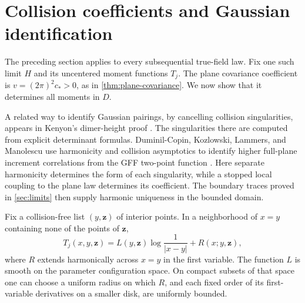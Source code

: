 \section{Collision coefficients and Gaussian identification}
\label{sec:gaussian}

The preceding section applies to every subsequential true-field law.
Fix one such limit $H$ and its uncentered moment functions $T_j$.
The plane covariance coefficient is
$v=(2\pi)^2c_*>0$, as in \cref{thm:plane-covariance}. We now show
that it determines all moments in $D$.

A related way to identify Gaussian pairings, by cancelling collision
singularities, appears in Kenyon's dimer-height proof
\cite[Lemma~3.1 and Proposition~3.2]{Kenyon2001}.  The singularities there
are computed from explicit determinant formulas.  Duminil-Copin,
Kozlowski, Lammers, and Manolescu use harmonicity and collision asymptotics
to identify higher full-plane increment correlations from the GFF
two-point function
\cite[Section~7.2]{DCKLM2026}.  Here separate harmonicity determines the
form of each singularity, while a stopped local coupling to the plane law
determines its coefficient.  The boundary traces proved in
\cref{sec:limits} then supply harmonic uniqueness in the bounded domain.

\begin{lemma}
\label{lem:log-singularity}
Fix a collision-free list $(y,\mathbf z)$ of interior points. In a
neighborhood of $x=y$ containing none of the points of $\mathbf z$,
\begin{equation}
 T_j(x,y,\mathbf z)
     =L(y,\mathbf z)\log\frac1{|x-y|}+R(x;y,\mathbf z),
 \label{eq:log-expansion}
\end{equation}
where $R$ extends harmonically across $x=y$ in the first variable.
The function $L$ is smooth on the parameter configuration space.
On compact subsets of that space one can choose a uniform radius
on which $R$, and each fixed order of its first-variable derivatives
on a smaller disk, are uniformly bounded.
\end{lemma}

